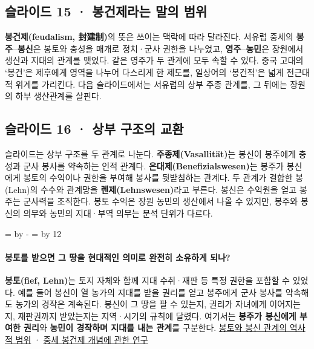 \documentclass[10pt,a4paper]{article}
\newcommand{\ReserveQuestionSpace}{%
  \par\begingroup
  \dimen0=\pagegoal \advance\dimen0 by -\pagetotal
  \dimen2=\baselineskip \multiply\dimen2 by 12
  \ifdim\dimen0<\dimen2 \newpage\fi
  \endgroup}
\begin{document}
\subsection{슬라이드 15 · 봉건제라는 말의 범위}
\textbf{봉건제(feudalism, 封建制)}의 뜻은 쓰이는 맥락에 따라 달라진다. 서유럽 중세의 \textbf{봉주–봉신}은 봉토와 충성을 매개로 정치·군사 권한을 나누었고, \textbf{영주–농민}은 장원에서 생산과 지대의 관계를 맺었다. 같은 영주가 두 관계에 모두 속할 수 있다. 중국 고대의 ‘봉건’은 제후에게 영역을 나누어 다스리게 한 제도를, 일상어의 ‘봉건적’은 넓게 전근대적 위계를 가리킨다. 다음 슬라이드에서는 서유럽의 상부 주종 관계를, 그 뒤에는 장원의 하부 생산관계를 살핀다.\par

\subsection{슬라이드 16 · 상부 구조의 교환}
슬라이드는 상부 구조를 두 관계로 나눈다. \textbf{주종제(Vasallität)}는 봉신이 봉주에게 충성과 군사 봉사를 약속하는 인적 관계다. \textbf{은대제(Benefizialswesen)}는 봉주가 봉신에게 봉토의 수익이나 권한을 부여해 봉사를 뒷받침하는 관계다. 두 관계가 결합한 봉(Lehn)의 수수와 관계망을 \textbf{렌제(Lehnswesen)}라고 부른다. 봉신은 수익원을 얻고 봉주는 군사력을 조직한다. 봉토 수익은 장원 농민의 생산에서 나올 수 있지만, 봉주와 봉신의 의무와 농민의 지대·부역 의무는 분석 단위가 다르다.\par

\ReserveQuestionSpace
\paragraph{봉토를 받으면 그 땅을 현대적인 의미로 완전히 소유하게 되나?}
\textbf{봉토(fief, Lehn)}는 토지 자체와 함께 지대 수취·재판 등 특정 권한을 포함할 수 있었다. 예를 들어 봉신이 열 농가의 지대를 받을 권리를 얻고 봉주에게 군사 봉사를 약속해도 농가의 경작은 계속된다. 봉신이 그 땅을 팔 수 있는지, 권리가 자녀에게 이어지는지, 재판권까지 받았는지는 지역·시기의 규칙에 달렸다. 여기서는 \textbf{봉주가 봉신에게 부여한 권리}와 \textbf{농민이 경작하며 지대를 내는 관계}를 구분한다. \href{https://hls-dhs-dss.ch/de/articles/009923/2009-11-25/}{봉토와 봉신 관계의 역사적 범위} · \href{https://www.cambridge.org/core/books/abs/property-power-and-authority-in-rus-and-latin-europe-ca-10001236/interprincely-agreements-and-a-question-of-feudovassalic-relations/8878FF1C91B2E1AD2A7ADD97BD196BA4}{중세 봉건제 개념에 관한 연구}\par
\end{document}
